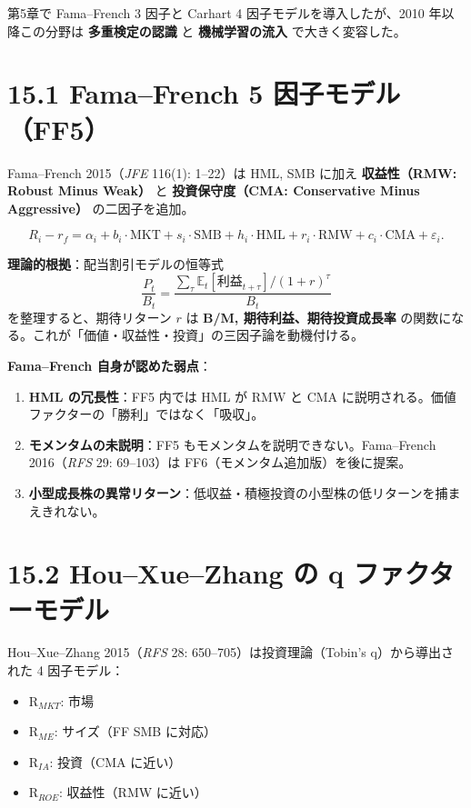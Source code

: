 \documentclass[11pt,a4paper]{report}
\begin{document}
第5章で Fama–French 3 因子と Carhart 4 因子モデルを導入したが、2010 年以降この分野は \textbf{多重検定の認識} と \textbf{機械学習の流入} で大きく変容した。

\section{15.1 Fama–French 5 因子モデル（FF5）}

Fama–French 2015（\emph{JFE} 116(1): 1–22）は HML, SMB に加え \textbf{収益性（RMW: Robust Minus Weak）} と \textbf{投資保守度（CMA: Conservative Minus Aggressive）} の二因子を追加。

\[ R_i - r_f = \alpha_i + b_i \cdot \mathrm{MKT} + s_i \cdot \mathrm{SMB} + h_i \cdot \mathrm{HML} + r_i \cdot \mathrm{RMW} + c_i \cdot \mathrm{CMA} + \varepsilon_i. \]

\textbf{理論的根拠}：配当割引モデルの恒等式 \[ \frac{P_t}{B_t} = \frac{\sum_\tau \mathbb{E}_t[\text{利益}_{t+\tau}]/(1 + r)^\tau}{B_t} \] を整理すると、期待リターン $r$ は \textbf{B/M, 期待利益、期待投資成長率} の関数になる。これが「価値・収益性・投資」の三因子論を動機付ける。

\textbf{Fama–French 自身が認めた弱点}：
\begin{enumerate}
\item \textbf{HML の冗長性}：FF5 内では HML が RMW と CMA に説明される。価値ファクターの「勝利」ではなく「吸収」。
\item \textbf{モメンタムの未説明}：FF5 もモメンタムを説明できない。Fama–French 2016（\emph{RFS} 29: 69–103）は FF6（モメンタム追加版）を後に提案。
\item \textbf{小型成長株の異常リターン}：低収益・積極投資の小型株の低リターンを捕まえきれない。
\end{enumerate}

\section{15.2 Hou–Xue–Zhang の q ファクターモデル}

Hou–Xue–Zhang 2015（\emph{RFS} 28: 650–705）は投資理論（Tobin's q）から導出された 4 因子モデル：

\begin{itemize}
\item $\mathrm{R}_{MKT}$: 市場
\item $\mathrm{R}_{ME}$: サイズ（FF SMB に対応）
\item $\mathrm{R}_{IA}$: 投資（CMA に近い）
\item $\mathrm{R}_{ROE}$: 収益性（RMW に近い）
\end{itemize}
\end{document}
